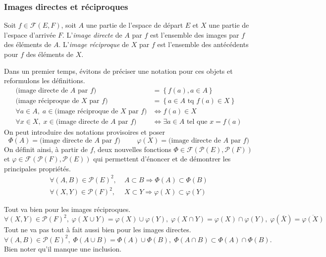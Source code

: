 \subsubsection{Images directes et réciproques}
 
\begin{defi}
  Soit $f\in \mathcal{F}(E,F)$, soit $A$ une partie de l'espace de départ $E$ et $X$ une partie de l'espace d'arrivée $F$.\newline
L'\emph{image directe} de $A$ par $f$ est l'ensemble des images par $f$ des éléments de $A$.\newline
L'\emph{image réciproque} de $X$ par $f$ est l'ensemble des antécédents pour $f$ des éléments de $X$.
\end{defi}
Dans un premier temps, évitons de préciser une notation pour ces objets et reformulons les définitions.
\begin{align*}
\text{(image directe de $A$ par $f$)} &= \left\lbrace f(a), a\in A \right\rbrace \\
\text{(image réciproque de $X$ par $f$)} &= \left\lbrace a\in A \text{ tq } f(a)\in X\right\rbrace\\
\forall a\in A, \; a\in \text{(image réciproque de $X$ par $f$)} &\Leftrightarrow f(a)\in X\\
\forall x\in X,\; x\in \text{(image directe de $A$ par $f$)} &\Leftrightarrow \exists a\in A \text{ tel que } x= f(a)
\end{align*}
On peut introduire des notations provisoires et poser
\begin{displaymath}
  \Phi(A) = \text{(image directe de $A$ par $f$)}\hspace{1cm} \varphi(X) = \text{(image directe de $A$ par $f$)}
\end{displaymath}
On définit ainsi, à partir de $f$, deux nouvelles fonctions $\Phi \in \mathcal{F}(\mathcal{P}(E),\mathcal{P}(F))$ et $\varphi \in \mathcal{F}(\mathcal{P}(F),\mathcal{P}(E))$ qui permettent d'énoncer et de démontrer les principales propriétés.
\[
\begin{aligned}
 \forall (A,B)\in \mathcal{P}(E)^2,&\; A \subset B \Rightarrow \Phi(A) \subset \Phi(B) \\
 \forall (X,Y)\in \mathcal{P}(F)^2,&\; X \subset Y \Rightarrow \varphi(X) \subset \varphi(Y)
\end{aligned}
\]

Tout va bien pour les images réciproques.
\begin{displaymath}
\forall (X,Y)\in \mathcal{P}(F)^2, \; \varphi(X\cup Y) = \varphi(X) \cup \varphi(Y), \; \varphi(X\cap Y) = \varphi(X) \cap \varphi(Y), \;
\varphi(\overline{X}) = \overline{\varphi(X)}
\end{displaymath}
Tout ne va pas tout à fait aussi bien pour les images directes.
\begin{displaymath}
\forall (A,B)\in \mathcal{P}(E)^2, \; \Phi(A\cup B) = \Phi(A) \cup \Phi(B), \; \Phi(A\cap B) \subset \Phi(A) \cap \Phi(B).
\end{displaymath}
Bien noter qu'il manque une inclusion. 

